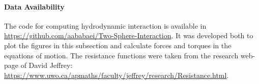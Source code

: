 \documentclass[../thesis.tex]{subfiles}
\begin{document}
\paragraph{Data Availability\label{sec:data}}
The code for computing hydrodynamic interaction is available in \url{https://github.com/aababaei/Two-Sphere-Interaction}. It was developed both to plot the figures in this subsection and calculate forces and torques in the equations of motion. The resistance functions were taken from the research web-page of David Jeffrey: \url{https://www.uwo.ca/apmaths/faculty/jeffrey/research/Resistance.html}.


%
%
\newpage
\end{document}
